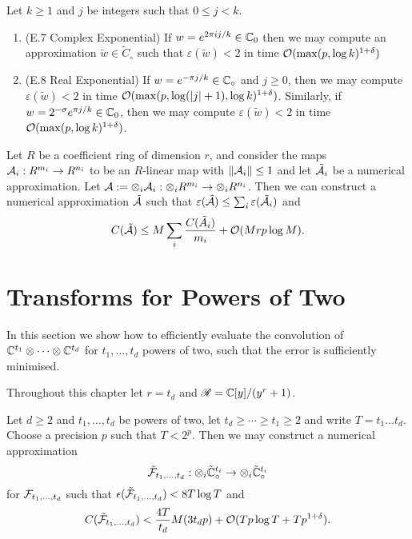 \begin{lemma}
    Let $k \ge 1$ and $j$ be integers such that $0 \le j < k$.
    \begin{enumerate}
        \item (E.7 Complex Exponential) If $w = e^{2\pi i j / k} \in {\mathbb C}_0$ then we may compute an approximation $\tilde{w} \in \tilde{C}_\circ$ such that $\varepsilon(\tilde{w}) < 2$ in time $\mathcal O(\max(p, \log k)^{1 + \delta})$
        \item (E.8 Real Exponential) If $w = e^{-\pi j / k} \in {\mathbb C}_\circ$ and $j \ge 0$, then we may compute $\varepsilon(\tilde{w}) < 2$ in time $\mathcal O(\max(p, \log (|j| + 1), \log k)^{1 + \delta})$. Similarly, if $w = 2^{- \sigma} e^{\pi j / k} \in {\mathbb C}_0$, then we may compute $\varepsilon(\tilde{w}) < 2$ in time $\mathcal O(\max(p, \log k)^{1 + \delta})$.
    \end{enumerate}
\end{lemma}


\begin{lemma}\label{lem:tensor-products}
    Let $R$ be a coefficient ring of dimension $r$, and consider the maps $\mathcal A_i : R^{m_i} \to R^{n_i}$ to be an $R$-linear map with $\|\mathcal A_i\| \le 1$ and let $\tilde{\mathcal A_i}$ be a numerical approximation. Let $\mathcal A := \otimes_i \mathcal A_i : \otimes_i R^{m_i} \to \otimes_i R^{n_i}$. Then we can construct a numerical approximation $\tilde{\mathcal A}$ such that $\varepsilon(\tilde{\mathcal A}) \le \sum_i \varepsilon(\tilde{\mathcal A}_i)$ and
    \[
        C(\tilde{\mathcal A}) \le M \sum_i\frac{C(\tilde{A}_i)}{m_i} + \mathcal O(Mrp \log M).
    \]
\end{lemma}


\section{Transforms for Powers of Two}
\label{sec:transforms-for-powers-of-two}

In this section we show how to efficiently evaluate the convolution of ${\mathbb C}^{t_1} \otimes \cdots \otimes {\mathbb C}^{t_d}$ for $t_1, \ldots, t_d$ powers of two, such that the error is sufficiently minimised.

Throughout this chapter let $r = t_d$ and $\mathscr{R} = {\mathbb C}[y] / (y^r + 1)$.

\begin{theorem}\label{thm:main-3}
    Let $d \geq 2$ and $t_1, \ldots, t_d$ be powers of two, let $t_d \geq \cdots \geq t_1 \geq 2$ and write $T = t_1 \ldots t_d$. Choose a precision $p$ such that $T < 2^p$. Then we may construct a numerical approximation
    \[
        \tilde {\mathcal F}_{t_1, \ldots, t_d} : \otimes_i \tilde{{\mathbb C}}^{t_i}_\circ \to \otimes_i \tilde{{\mathbb C}}^{t_i}_\circ
    \]
    for $\mathcal F_{t_1, \ldots, t_d}$ such that $\epsilon(\tilde{\mathcal F}_{t_1, \ldots, t_d}) < 8 T \log T$ and
    \[
        C(\tilde{\mathcal F}_{t_1, \ldots, t_d}) < \frac{4T}{t_d} M(3t_d p) + \mathcal O(Tp\log T + Tp^{1 + \delta}).
    \]
\end{theorem}

